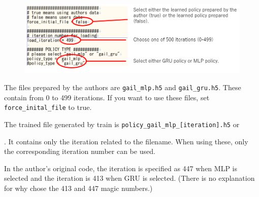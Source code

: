 \documentclass[openany,11pt]{report}%
\begin{document}
\begin{figure}[h]
    \centering
    \includegraphics[width=\textwidth]{img/example_change.png}
    \label{fig:initialvalues}
\end{figure}

The files prepared by the authors are {\tt gail\_mlp.h5} and {\tt gail\_gru.h5}. These contain from 0 to 499 iterations. If you want to use these files, set {\tt force\_inital\_file} to true.

The trained file generated by train is {\tt policy\_gail\_mlp\_[iteration].h5} or 

\hspace{-6mm}{\tt policy\_gil\_gru\_[iteration].h5}.
It contains only the iteration related to the filename. When using these, only the corresponding iteration number can be used.

In the author's original code, the iteration is specified as 447 when MLP is selected and the iteration is 413 when GRU is selected. (There is no explanation for why chose the 413 and 447 magic numbers.)
\end{document}
